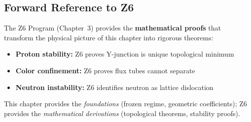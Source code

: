 \subsection{Forward Reference to Z6}

The Z6 Program (Chapter~3) provides the \textbf{mathematical proofs} that transform the
physical picture of this chapter into rigorous theorems:

\begin{itemize}
    \item \textbf{Proton stability:} Z6 proves Y-junction is unique topological minimum
    \item \textbf{Color confinement:} Z6 proves flux tubes cannot separate
    \item \textbf{Neutron instability:} Z6 identifies neutron as lattice dislocation
\end{itemize}

This chapter provides the \emph{foundations} (frozen regime, geometric coefficients);
Z6 provides the \emph{mathematical derivations} (topological theorems, stability proofs).
